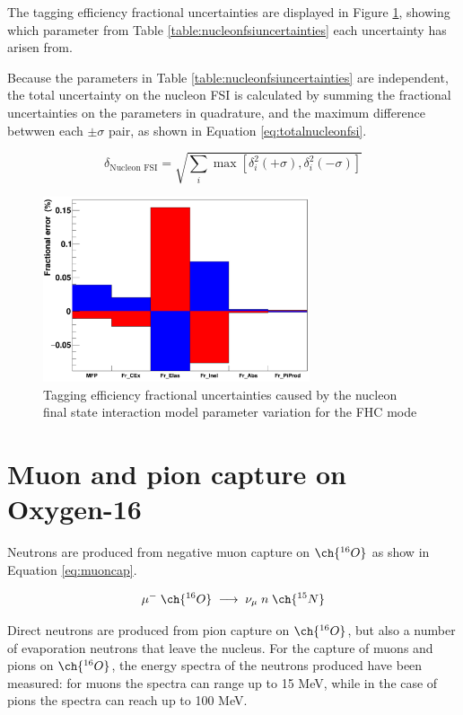 The tagging efficiency fractional uncertainties are displayed in Figure \ref{fig:nucleonfsiuncertainty}, showing which parameter from Table \ref{table:nucleonfsiuncertainties} each uncertainty has arisen from.

Because the parameters in Table \ref{table:nucleonfsiuncertainties} are independent, the total uncertainty on the nucleon FSI is calculated by summing the fractional uncertainties on the parameters in quadrature, and the maximum difference betwwen each $\pm \sigma$ pair, as shown in Equation \ref{eq:totalnucleonfsi}.

\begin{equation}
    \delta_{\text{Nucleon FSI}}=\sqrt{\sum_i \max \left[\delta_i^2(+\sigma), \delta_i^2(-\sigma)\right]}
\label{eq:totalnucleonfsi}
\end{equation}

\begin{figure}[!htb]
\centering 
    \includegraphics[width=0.7\textwidth]{Figures/nucleonfsi_uncertainty.png}
\caption{Tagging efficiency fractional uncertainties caused by the nucleon final state interaction model parameter variation for the FHC mode}
\label{fig:nucleonfsiuncertainty}
\end{figure}

\section{Muon and pion capture on Oxygen-16}

Neutrons are produced from negative muon capture on $\ch{^{16}O}$ as show in Equation \ref{eq:muoncap}.

\begin{equation}
        \mu^{-}\;\ch{^{16}{O}}\;\longrightarrow\;\nu_{\mu}\;n\;\ch{^{15}{N}}
\label{eq:muoncap}
\end{equation}

Direct neutrons are produced from pion capture on $\ch{^{16}O}$, but also a number of evaporation neutrons that leave the nucleus. For the capture of muons and pions on $\ch{^{16}O}$, the energy spectra of the neutrons produced have been measured: for muons the spectra can range up to 15 MeV, while in the case of pions the spectra can reach up to 100 MeV.


